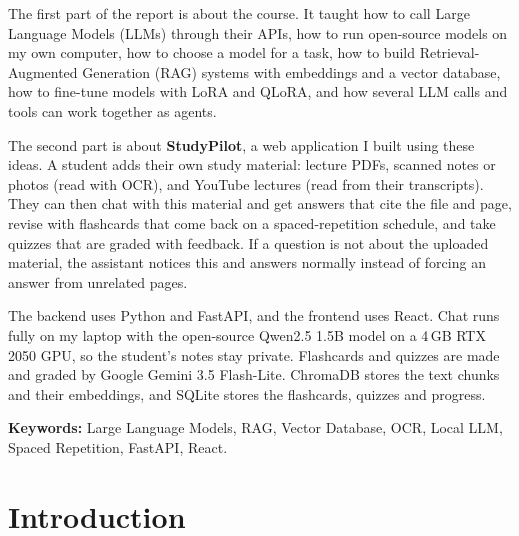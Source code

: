 \documentclass[12pt,a4paper]{report}
\begin{document}
The first part of the report is about the course. It taught how to call Large Language
Models (LLMs) through their APIs, how to run open-source models on my own computer, how to
choose a model for a task, how to build Retrieval-Augmented Generation (RAG) systems with
embeddings and a vector database, how to fine-tune models with LoRA and QLoRA, and how
several LLM calls and tools can work together as agents.

The second part is about \textbf{StudyPilot}, a web application I built using these ideas.
A student adds their own study material: lecture PDFs, scanned notes or photos (read with
OCR), and YouTube lectures (read from their transcripts). They can then chat with this
material and get answers that cite the file and page, revise with flashcards that come back
on a spaced-repetition schedule, and take quizzes that are graded with feedback. If a
question is not about the uploaded material, the assistant notices this and answers
normally instead of forcing an answer from unrelated pages.

The backend uses Python and FastAPI, and the frontend uses React. Chat runs fully on my
laptop with the open-source Qwen2.5 1.5B model on a 4\,GB RTX 2050 GPU, so the student's
notes stay private. Flashcards and quizzes are made and graded by Google Gemini 3.5
Flash-Lite. ChromaDB stores the text chunks and their embeddings, and SQLite stores the
flashcards, quizzes and progress.

\vspace{8pt}
\noindent\textbf{Keywords:} Large Language Models, RAG, Vector Database, OCR, Local LLM,
Spaced Repetition, FastAPI, React.

\begingroup{}\tableofcontents\endgroup
\begingroup{}
\listoffigures
\let\clearpage\relax\let\cleardoublepage\relax
\vspace{6pt}
\listoftables
\endgroup

\clearpage
{}

\chapter{Introduction}
\end{document}
